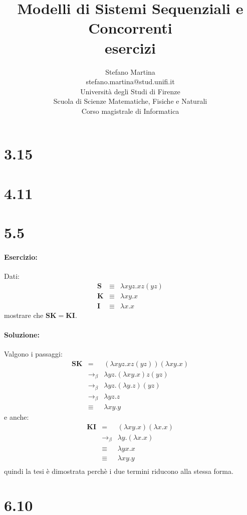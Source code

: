 \documentclass[a4paper,twosides]{report}
\author{
  {\Large Stefano Martina}\\
  {\small stefano.martina@stud.unifi.it}\\
  Universit\`a degli Studi di Firenze\\
  Scuola di Scienze Matematiche, Fisiche e Naturali\\
  Corso magistrale di Informatica
}
\title{{\Huge\bfseries Modelli di Sistemi Sequenziali e
    Concorrenti}\\{\large\bfseries esercizi}}
\newcommand{\betaReduction}{\ensuremath{\longrightarrow_{\beta}}}
\begin{document}
\maketitle

\section*{3.15}

\section*{4.11}

\section*{5.5}
\paragraph{Esercizio:}
Dati:
\begin{eqnarray*}
  \mathbf{S}&\equiv&\lambda xyz.xz(yz)\\
  \mathbf{K}&\equiv&\lambda xy.x\\
  \mathbf{I}&\equiv&\lambda x.x
\end{eqnarray*}
mostrare che $\mathbf{SK}=\mathbf{KI}$.
\paragraph{Soluzione:}
Valgono i passaggi:
\begin{eqnarray*}
  \mathbf{SK}&=&(\lambda xyz.xz(yz))(\lambda xy.x)\\
  &\betaReduction&\lambda yz.(\lambda xy.x)z(yz)\\
  &\betaReduction&\lambda yz.(\lambda y.z)(yz)\\
  &\betaReduction&\lambda yz.z\\
  &\equiv&\lambda xy.y
\end{eqnarray*}
e anche:
\begin{eqnarray*}
  \mathbf{KI}&=&(\lambda xy.x)(\lambda x.x)\\
  &\betaReduction&\lambda y.(\lambda x.x)\\
  &\equiv&\lambda yx.x\\
  &\equiv&\lambda xy.y\\
\end{eqnarray*}
quindi la tesi \`e dimostrata perch\`e i due termini riducono alla
stessa forma. 
\section*{6.10}
\end{document}
